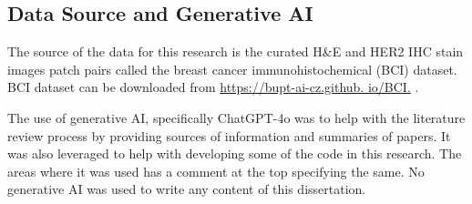 
\begin{dedication} %


\section{Data Source and Generative AI}

The source of the data for this research is the curated H\&E and HER2 IHC stain images patch pairs called the breast cancer immunohistochemical (BCI) dataset. BCI dataset can be downloaded from \href{https://bupt-ai-cz.github. io/BCI.}{https://bupt-ai-cz.github. io/BCI.} \parencite{Liu2022BCI:Pix2pix}. 

The use of generative AI, specifically ChatGPT-4o was to help with the literature review process by providing sources of information and summaries of papers. It was also leveraged to help with developing some of the code in this research. The areas where it was used has a comment at the top specifying the same. No generative AI was used to write any content of this dissertation. 

\end{dedication}

